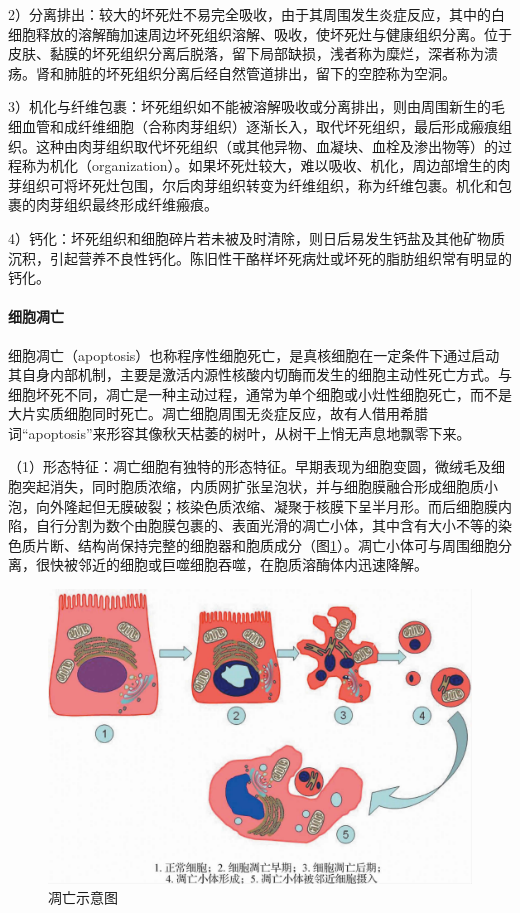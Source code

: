 2）分离排出：较大的坏死灶不易完全吸收，由于其周围发生炎症反应，其中的白细胞释放的溶解酶加速周边坏死组织溶解、吸收，使坏死灶与健康组织分离。位于皮肤、黏膜的坏死组织分离后脱落，留下局部缺损，浅者称为糜烂，深者称为溃疡。肾和肺脏的坏死组织分离后经自然管道排出，留下的空腔称为空洞。

3）机化与纤维包裹：坏死组织如不能被溶解吸收或分离排出，则由周围新生的毛细血管和成纤维细胞（合称肉芽组织）逐渐长入，取代坏死组织，最后形成瘢痕组织。这种由肉芽组织取代坏死组织（或其他异物、血凝块、血栓及渗出物等）的过程称为机化（organization）。如果坏死灶较大，难以吸收、机化，周边部增生的肉芽组织可将坏死灶包围，尔后肉芽组织转变为纤维组织，称为纤维包裹。机化和包裹的肉芽组织最终形成纤维瘢痕。

4）钙化：坏死组织和细胞碎片若未被及时清除，则日后易发生钙盐及其他矿物质沉积，引起营养不良性钙化。陈旧性干酪样坏死病灶或坏死的脂肪组织常有明显的钙化。

\paragraph{细胞凋亡}
细胞凋亡（apoptosis）也称程序性细胞死亡，是真核细胞在一定条件下通过启动其自身内部机制，主要是激活内源性核酸内切酶而发生的细胞主动性死亡方式。与细胞坏死不同，凋亡是一种主动过程，通常为单个细胞或小灶性细胞死亡，而不是大片实质细胞同时死亡。凋亡细胞周围无炎症反应，故有人借用希腊词“apoptosis”来形容其像秋天枯萎的树叶，从树干上悄无声息地飘零下来。

（1）形态特征：凋亡细胞有独特的形态特征。早期表现为细胞变圆，微绒毛及细胞突起消失，同时胞质浓缩，内质网扩张呈泡状，并与细胞膜融合形成细胞质小泡，向外隆起但无膜破裂；核染色质浓缩、凝聚于核膜下呈半月形。而后细胞膜内陷，自行分割为数个由胞膜包裹的、表面光滑的凋亡小体，其中含有大小不等的染色质片断、结构尚保持完整的细胞器和胞质成分（图\ref{fig1-18}）。凋亡小体可与周围细胞分离，很快被邻近的细胞或巨噬细胞吞噬，在胞质溶酶体内迅速降解。

\begin{figure}[!htbp]
	\centering
	\includegraphics[width=.7\textwidth]{./images/Image00019.jpg}
	\caption{凋亡示意图}
	\label{fig1-18}
\end{figure}

